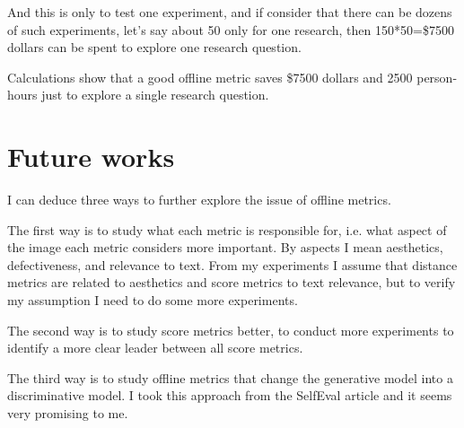 And this is only to test one experiment, and if consider that there can be dozens of such experiments, let's say about 50 only for one research, then 150*50=\$7500 dollars can be spent to explore one research question.

Calculations show that a good offline metric saves \$7500 dollars and 2500 person-hours just to explore a single research question.

\section{Future works}
I can deduce three ways to further explore the issue of offline metrics.

The first way is to study what each metric is responsible for, i.e. what aspect of the image each metric considers more important. By aspects I mean aesthetics, defectiveness, and relevance to text. From my experiments I assume that distance metrics are related to aesthetics and score metrics to text relevance, but to verify my assumption I need to do some more experiments.

The second way is to study score metrics better, to conduct more experiments to identify a more clear leader between all score metrics.

The third way is to study offline metrics that change the generative model into a discriminative model. I took this approach from the SelfEval\cite{SelfEval} article and it seems very promising to me.